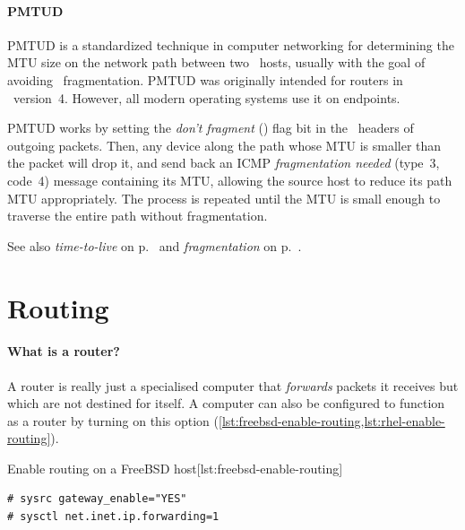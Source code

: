 

\paragraph{\acl{PMTUD}}

\Acf{PMTUD} is a standardized technique in computer networking for determining the \acf{MTU} size on the network path between two \IP\ hosts, usually with the goal of avoiding \IP\ fragmentation.
\Acl{PMTUD} was originally intended for routers in \IP\ version~4.
However, all modern operating systems use it on endpoints.

\Acl{PMTUD} works by setting the \emph{don't fragment} () flag bit in the \IP\ headers of outgoing packets.
Then, any device along the path whose \acs{MTU} is smaller than the packet will drop it, and send back an \acs{ICMP} \emph{fragmentation needed} (type~3, code~4) message containing its \acs{MTU}, allowing the source host to reduce its path \acs{MTU} appropriately.
The process is repeated until the \acs{MTU} is small enough to traverse the entire path without fragmentation.

See also \emph{time-to-live} on p.~\pageref{par:ip-ttl} and \emph{fragmentation} on p.~\pageref{par:ip-fragmentation}.







\section{Routing}
\label{sec:ip-routing}

\paragraph{What is a router?}
A router is really just a specialised computer that \emph{forwards} packets it receives but which are not destined for itself.
A computer can also be configured to function as a router by turning on this option (\vref{lst:freebsd-enable-routing,lst:rhel-enable-routing}).


\begin{fltlisting}[h!]
\begin{sidecaption}{Enable routing on a FreeBSD host}[lst:freebsd-enable-routing]
\begin{lstlisting}
# sysrc gateway_enable="YES"
# sysctl net.inet.ip.forwarding=1
\end{lstlisting}
\end{sidecaption}
\end{fltlisting}

